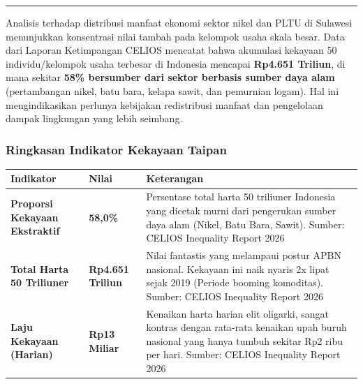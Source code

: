 \documentclass[
]{article}
\newcounter{none} %
\begin{document}
\begin{center}\rule{0.5\linewidth}{0.5pt}\end{center}

Analisis terhadap distribusi manfaat ekonomi sektor nikel dan PLTU di
Sulawesi menunjukkan konsentrasi nilai tambah pada kelompok usaha skala
besar. Data dari Laporan Ketimpangan CELIOS mencatat bahwa akumulasi
kekayaan 50 individu/kelompok usaha terbesar di Indonesia mencapai
\textbf{Rp4.651 Triliun}, di mana sekitar \textbf{58\% bersumber dari
sektor berbasis sumber daya alam} (pertambangan nikel, batu bara, kelapa
sawit, dan pemurnian logam). Hal ini mengindikasikan perlunya kebijakan
redistribusi manfaat dan pengelolaan dampak lingkungan yang lebih
seimbang.

\subsubsection{Ringkasan Indikator Kekayaan
Taipan}\label{ringkasan-indikator-kekayaan-taipan}

{\def\LTcaptype{none} %
\begin{longtable}[]{@{}
  >{\raggedright\arraybackslash}p{}
  >{\raggedright\arraybackslash}p{}
  >{\raggedright\arraybackslash}p{}@{}}
\toprule\noalign{}
\begin{minipage}[b]{\linewidth}\raggedright
Indikator
\end{minipage} & \begin{minipage}[b]{\linewidth}\raggedright
Nilai
\end{minipage} & \begin{minipage}[b]{\linewidth}\raggedright
Keterangan
\end{minipage} \\
\midrule\noalign{}
\endhead
\bottomrule\noalign{}
\endlastfoot
\textbf{Proporsi Kekayaan Ekstraktif} & \textbf{58,0\%} & Persentase
total harta 50 triliuner Indonesia yang dicetak murni dari pengerukan
sumber daya alam (Nikel, Batu Bara, Sawit). Sumber: CELIOS Inequality
Report 2026 \\
\textbf{Total Harta 50 Triliuner} & \textbf{Rp4.651 Triliun} & Nilai
fantastis yang melampaui postur APBN nasional. Kekayaan ini naik nyaris
2x lipat sejak 2019 (Periode booming komoditas). Sumber: CELIOS
Inequality Report 2026 \\
\textbf{Laju Kekayaan (Harian)} & \textbf{Rp13 Miliar} & Kenaikan harta
harian elit oligarki, sangat kontras dengan rata-rata kenaikan upah
buruh nasional yang hanya tumbuh sekitar Rp2 ribu per hari. Sumber:
CELIOS Inequality Report 2026 \\
\end{longtable}
}
\end{document}
